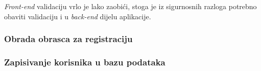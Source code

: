     \textit{Front-end} validaciju vrlo je lako zaobići, stoga je iz
    sigurnosnih razloga potrebno obaviti validaciju i u \textit{back-end}
    dijelu aplikacije.

    \subsubsection{Obrada obrasca za registraciju}

      

    \subsubsection{Zapisivanje korisnika u bazu podataka}

      
